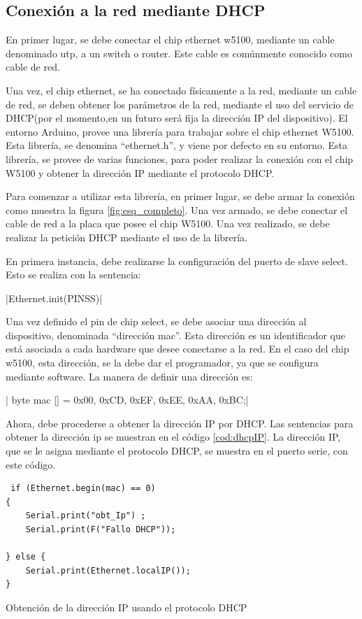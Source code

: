 \subsection{Conexión a la red mediante DHCP} 

En primer lugar, se debe conectar el chip ethernet w5100, mediante un cable denominado utp, a un switch o router.   Este cable es comúnmente conocido como cable de red.

 Una vez, el chip ethernet, se ha conectado físicamente a la red, mediante un cable de red, se deben obtener los parámetros de la red, mediante el uso del servicio de DHCP(por el momento,en un futuro será fija la dirección IP del dispositivo). El entorno Arduino, provee una librería para trabajar sobre el chip ethernet W5100. Esta librería, se denomina ``ethernet.h'', y viene por defecto en su entorno. Esta librería, se provee de varias funciones, para poder realizar la conexión con el chip W5100 y obtener la dirección IP mediante el protocolo DHCP. 
 
 Para comenzar a utilizar esta librería, en primer lugar, se debe armar la conexión como muestra la figura \ref{fig:esq_completo}. Una vez armado, se debe conectar el cable de red a la placa que posee el chip W5100. Una vez realizado, se debe realizar la petición DHCP mediante el uso de la librería. 

En primera instancia, debe realizarse la configuración del puerto de slave select. Esto se realiza con la sentencia:  

|Ethernet.init(PINSS)| 

Una vez definido el pin de chip select, se debe asociar una dirección al dispositivo, denominada ``dirección mac''. Esta dirección es un identificador que está asociada a cada hardware que desee conectarse a la red. En el caso del chip w5100, esta dirección, se la debe dar el programador, ya que se configura mediante software. La manera de definir una dirección es: 

|  byte mac [] = {0x00, 0xCD, 0xEF, 0xEE, 0xAA, 0xBC};|  

Ahora, debe procederse a obtener la dirección IP por DHCP. Las sentencias para obtener la dirección ip se muestran en el código \ref{cod:dhcpIP}. La dirección IP, que se le asigna mediante el protocolo DHCP, se muestra en el puerto serie, con este código.

\begin{listing}[ht]
	\begin{verbatim}
 if (Ethernet.begin(mac) == 0)
{
	Serial.print("obt_Ip") ;
	Serial.print(F("Fallo DHCP"));
	
} else {
	Serial.print(Ethernet.localIP());
}		
	\end{verbatim}
\caption{Obtención de la dirección IP usando el protocolo DHCP} 	
\label{cod:dhcpIP} 
\end{listing}


